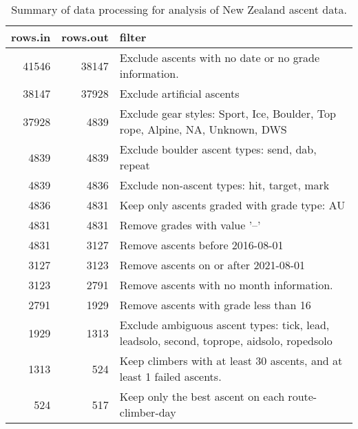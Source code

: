 \begin{table}[ht]
\centering
\begingroup\fontsize{9pt}{10pt}\selectfont
\begin{tabular}{rrl}
  \hline
{\bf rows.in} & {\bf rows.out} & {\bf filter} \\ 
  \hline
41546 & 38147 & Exclude ascents with no date or no grade information. \\ 
  38147 & 37928 & Exclude artificial ascents \\ 
  37928 & 4839 & Exclude gear styles: Sport, Ice, Boulder, Top rope, Alpine, NA, Unknown, DWS \\ 
  4839 & 4839 & Exclude boulder ascent types: send, dab, repeat \\ 
  4839 & 4836 & Exclude non-ascent types: hit, target, mark \\ 
  4836 & 4831 & Keep only ascents graded with grade type: AU \\ 
  4831 & 4831 & Remove grades with value '--' \\ 
  4831 & 3127 & Remove ascents before 2016-08-01 \\ 
  3127 & 3123 & Remove ascents on or after 2021-08-01 \\ 
  3123 & 2791 & Remove ascents with no month information. \\ 
  2791 & 1929 & Remove ascents with grade less than 16 \\ 
  1929 & 1313 & Exclude ambiguous ascent types: tick, lead, leadsolo, second, toprope, aidsolo, ropedsolo \\ 
  1313 & 524 & Keep climbers with at least 30 ascents, and at least 1 failed ascents. \\ 
  524 & 517 & Keep only the best ascent on each route-climber-day \\ 
   \hline
\end{tabular}
\endgroup
\caption{Summary of data processing for analysis of New Zealand ascent data.} 
\label{table-data-processing-nz}
\end{table}
